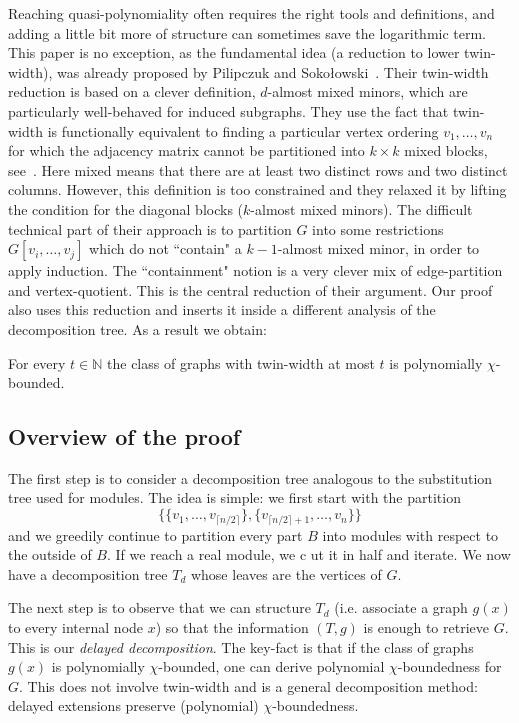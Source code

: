 \documentclass[11pt]{article}
\numberwithin{equation}{section}
\newcommand{\pcb}{polynomially $\chi$-bounded}
\begin{document}
Reaching quasi-polynomiality often requires the right tools and definitions, and adding a little bit more of structure can sometimes save the logarithmic term.
This paper is no exception, as the fundamental idea (a reduction to lower twin-width), was already proposed by Pilipczuk and Soko\l{}owski~\cite{PS22}. Their twin-width reduction is based on a clever definition, $d$-almost mixed minors, which are particularly well-behaved for induced subgraphs. 
They use the fact that twin-width is functionally equivalent to finding a particular vertex ordering $v_1,\dots ,v_n$ for which the adjacency matrix cannot be partitioned into $k\times k$ mixed blocks, see~\cite{BKTW21}. Here mixed means that there are at least two distinct rows and 
two distinct columns. However, this definition is too constrained and they relaxed it by lifting the condition for the diagonal blocks ($k$-almost mixed minors). The difficult technical part of their approach is to partition $G$ into some restrictions $G[v_i,\dots,v_j]$ which do not ``contain" a $k-1$-almost mixed minor, in order to apply induction. The ``containment" notion is a very clever mix of edge-partition and vertex-quotient. This is the central reduction of their argument.
Our proof also uses this reduction and inserts it inside a different analysis of the decomposition tree. As a result we obtain:

\begin{theorem}\label{th:BT}
For every $t \in \mathbb{N}$ the class of graphs with twin-width at most $t$ is polynomially $\chi$-bounded. 
\end{theorem}

\subsection{Overview of the proof}
The first step is to consider a decomposition tree analogous to the substitution tree used for modules. The idea is simple: we first start with the partition $$\{\{v_1, \ldots, v_{\lceil n/2 \rceil}\}, \{v_{\lceil n/2 \rceil + 1}, \ldots, v_n\}\}$$ and we greedily continue to partition every part $B$ into modules with respect to the outside of $B$. If we reach a real module, we c
ut it in half and iterate. We now have a decomposition tree $T_d$ whose leaves are the vertices of $G$.

The next step is to observe that we can structure $T_d$ (i.e. associate a graph $g(x)$ to every internal node $x$) so that the information $(T,g)$ is enough to retrieve $G$. This is our \emph{delayed decomposition}. The key-fact is that if the class of graphs $g(x)$ is \pcb, one can derive polynomial $\chi$-boundedness for $G$. This does not involve twin-width and is a general decomposition method: delayed extensions preserve (polynomial) $\chi$-boundedness.
\end{document}
